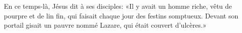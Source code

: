En ce temps-là, Jésus dit à ses disciples:
	«Il y avait un homme riche, vêtu de pourpre et de lin fin,
	qui faisait chaque jour des festins somptueux.
Devant son portail gisait un pauvre nommé Lazare, qui était couvert d’ulcères.»
